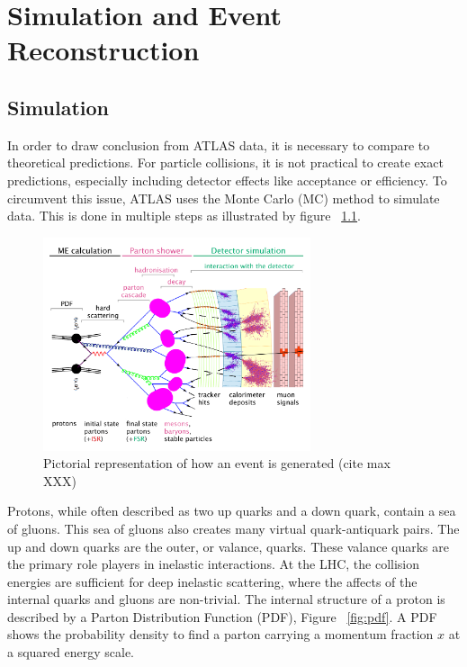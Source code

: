 \chapter{Simulation and Event Reconstruction}

\section{Simulation}
In order to draw conclusion from ATLAS data, it is necessary to compare to theoretical predictions. For particle collisions, it is not practical to create exact predictions, especially including detector effects like acceptance or efficiency. To circumvent this issue, ATLAS uses the Monte Carlo (MC) method to simulate data. This is done in multiple steps as illustrated by figure ~\ref{fig:eventsim}. \linebreak

\begin{figure}[h]
\begin{center}
\includegraphics*[width=0.70\textwidth] {figures/event_simulation}
\caption{Pictorial representation of how an event is generated (cite max XXX)}
\label{fig:eventsim}
\end{center}
\end{figure}


\indent Protons, while often described as two up quarks and a down quark, contain a sea of gluons. This sea of gluons also creates many virtual quark-antiquark pairs. The up and down quarks are the outer, or valance, quarks. These valance quarks are the primary role players in inelastic interactions. At the LHC, the collision energies are sufficient for deep inelastic scattering, where the affects of the internal quarks and gluons are non-trivial. The internal structure of a proton is described  by a Parton Distribution Function (PDF), Figure ~\ref{fig:pdf}. A PDF shows the probability density to find a parton carrying a momentum fraction ${x}$ at a squared energy scale. %
\linebreak

